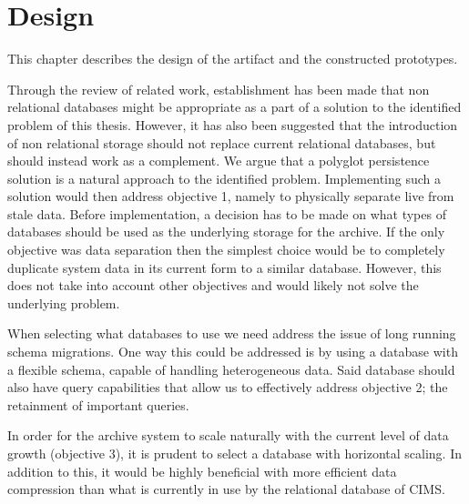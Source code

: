 \chapter{Design}
\label{chap:design}


This chapter describes the design of the artifact and the constructed prototypes.

Through the review of related work, establishment has been made that non relational databases might be appropriate as a part of a solution to the identified problem of this thesis. However, it has also been suggested \cite{NoSQLSurvey} that the introduction of non relational storage should not replace current relational databases, but should instead work as a complement. We argue that a polyglot persistence solution is a natural approach to the identified problem. Implementing such a solution would then address objective 1, namely to physically separate live from stale data. Before implementation, a decision has to be made on what types of databases should be used as the underlying storage for the archive. If the only objective was data separation then the simplest choice would be to completely duplicate system data in its current form to a similar database. However, this does not take into account other objectives and would likely not solve the underlying problem. 

When selecting what databases to use we need address the issue of long running schema migrations. One way this could be addressed is by using a database with a flexible schema, capable of handling heterogeneous data. Said database should also have query capabilities that allow us to effectively address objective 2; the retainment of important queries.

In order for the archive system to scale naturally with the current level of data growth (objective 3), it is prudent to select a database with horizontal scaling. In addition to this, it would be highly beneficial with more efficient data compression than what is currently in use by the relational database of CIMS.

